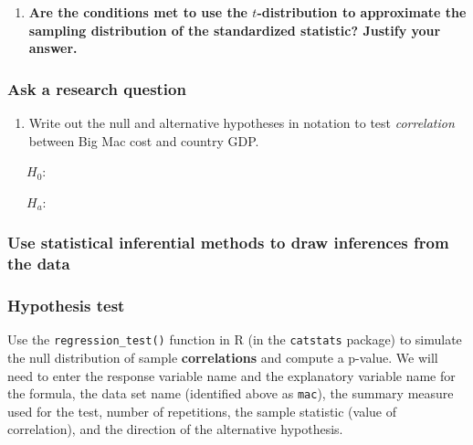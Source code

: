 \documentclass[
]{report}
\providecommand{\tightlist}{%
  \setlength{\itemsep}{0pt}\setlength{\parskip}{0pt}}
\begin{document}
\begin{enumerate}
\def\labelenumi{\arabic{enumi}.}
\setcounter{enumi}{4}
\tightlist
\item
  \textbf{Are the conditions met to use the \(t\)-distribution to approximate the sampling distribution of the standardized statistic? Justify your answer.}
\end{enumerate}

\vspace{1.5in}

\newpage

\hypertarget{ask-a-research-question-7}{%
\subsubsection*{Ask a research question}\label{ask-a-research-question-7}}

\begin{enumerate}
\def\labelenumi{\arabic{enumi}.}
\setcounter{enumi}{5}
\tightlist
\item
  Write out the null and alternative hypotheses in notation to test \emph{correlation} between Big Mac cost and country GDP.
\end{enumerate}

~~~\(H_0:\)

~~~\(H_a:\)

\hypertarget{use-statistical-inferential-methods-to-draw-inferences-from-the-data-7}{%
\subsubsection*{Use statistical inferential methods to draw inferences from the data}\label{use-statistical-inferential-methods-to-draw-inferences-from-the-data-7}}

\hypertarget{hypothesis-test-4}{%
\subsubsection*{Hypothesis test}\label{hypothesis-test-4}}

Use the \texttt{regression\_test()} function in R (in the \texttt{catstats} package) to simulate the null distribution of sample \textbf{correlations} and compute a p-value. We will need to enter the response variable name and the explanatory variable name for the formula, the data set name (identified above as \texttt{mac}), the summary measure used for the test, number of repetitions, the sample statistic (value of correlation), and the direction of the alternative hypothesis.
\end{document}
